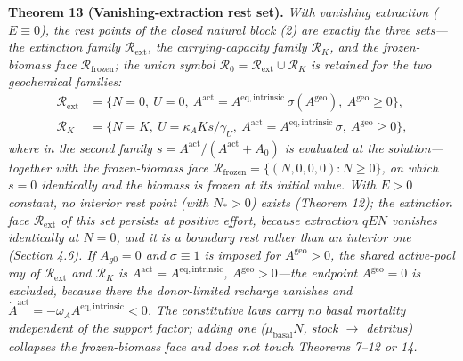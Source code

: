 \documentclass[11pt]{article}
\begin{document}
\textbf{Theorem 13 (Vanishing-extraction rest set).} \emph{With vanishing extraction (\(E \equiv 0\)), the rest points of the closed natural block (2) are exactly the three sets---the extinction family \(\mathcal{R}_{\mathrm{ext}}\), the carrying-capacity family \(\mathcal{R}_K\), and the frozen-biomass face \(\mathcal{R}_{\mathrm{frozen}}\); the union symbol \(\mathcal{R}_0 = \mathcal{R}_{\mathrm{ext}} \cup \mathcal{R}_K\) is retained for the two geochemical families:}
\[ \begin{aligned} \mathcal{R}_{\mathrm{ext}} &= \bigl\{ N = 0,\ U = 0,\ A^{\mathrm{act}} =
    A^{\mathrm{eq,intrinsic}}\,\sigma(A^{\mathrm{geo}}),\ A^{\mathrm{geo}} \ge 0 \bigr\}, \\[2pt]
    \mathcal{R}_K &= \bigl\{ N = K,\ U = \kappa_A K s/\gamma_U,\ A^{\mathrm{act}} =
    A^{\mathrm{eq,intrinsic}}\,\sigma,\ A^{\mathrm{geo}} \ge 0 \bigr\}, \end{aligned} \]
\emph{where in the second family \(s = A^{\mathrm{act}}/(A^{\mathrm{act}} + A_0)\) is evaluated at the solution---together with the frozen-biomass face \(\mathcal{R}_{\mathrm{frozen}} = \{(N, 0, 0, 0) : N \ge 0\}\), on which \(s = 0\) identically and the biomass is frozen at its initial value. With \(E > 0\) constant, no interior rest point (with \(N_* > 0\)) exists (Theorem 12); the extinction face \(\mathcal{R}_{\mathrm{ext}}\) of this set persists at positive effort, because extraction \(qEN\) vanishes identically at \(N = 0\), and it is a boundary rest rather than an interior one (Section 4.6). If \(A_{g0} = 0\) and \(\sigma \equiv 1\) is imposed for \(A^{\mathrm{geo}} > 0\), the shared active-pool ray of \(\mathcal{R}_{\mathrm{ext}}\) and \(\mathcal{R}_K\) is \(A^{\mathrm{act}} = A^{\mathrm{eq,intrinsic}}\), \(A^{\mathrm{geo}} > 0\)---the endpoint \(A^{\mathrm{geo}} = 0\) is excluded, because there the donor-limited recharge vanishes and \(\dot A^{\mathrm{act}} = -\omega_A A^{\mathrm{eq,intrinsic}} < 0\). The constitutive laws carry no basal mortality independent of the support factor; adding one (\(\mu_{\mathrm{basal}} N\), stock \(\to\) detritus) collapses the frozen-biomass face and does not touch Theorems 7--12 or 14.}
\end{document}
